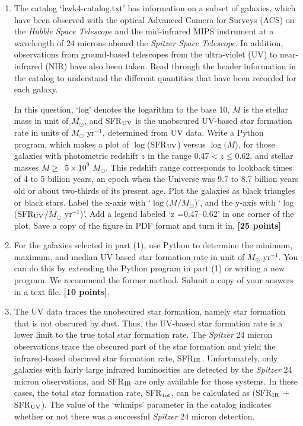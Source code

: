\documentclass[11pt]{article}    %
\begin{document}
\begin{enumerate}

\vspace{1mm}
\item
\noindent
The catalog  `hwk4-catalog.txt' has information on a subset of 
galaxies, which have been observed with the optical 
Advanced Camera for Surveys (ACS) on the {\it Hubble Space Telescope}
and the mid-infrared MIPS  instrument at a wavelength of 24 microns aboard 
the {\it Spitzer Space Telescope}.  In addition, observations from 
ground-based telescopes from the ultra-violet (UV) to near-infrared (NIR) 
have also been taken.  Read through the header information in the catalog
to understand the different quantities that have been recorded for 
each galaxy. 

In this question, `log' denotes
the logarithm to the base 10,  $M$ is the stellar mass in unit of  
$M_{\odot}$, and SFR$_{\rm UV}$ is the unobscured
UV-based star formation rate  in units of $M_{\odot}$  yr$^{-1}$,
determined from UV data.
Write a Python program, 
which makes a plot of $\log$(SFR$_{\rm UV}$) versus $\log(M$), for 
those galaxies with photometric redshift $z$ in the range 
$0.47 < z \le 0.62$, and  stellar masses 
$M \ge$~$5 \times  10^{9}$ $M_{\odot}$. 
This redshift range corresponds to lookback times of 
4 to 5 billion years, an epoch when the Universe was 9.7 to 8.7 
billion years old or about two-thirds of its present age. 
Plot the galaxies as black triangles or black stars.
Label the x-axis with  `$\log(M/M_{\odot}$)', and the y-axis with
`$\log$(SFR$_{\rm UV}$/$M_{\odot}$  yr$^{-1}$)'.
Add a legend labeled `z =0.47--0.62' in one corner of the plot.
Save a copy of the figure in PDF format and turn it in.
 {\bf [25 points]}

\vspace{1mm}
\item
\noindent
For the galaxies selected in part (1), use Python to determine the
minimum, maximum, and median UV-based star formation rate in unit of 
$M_{\odot}$ yr$^{-1}$. You can do this by extending the Python program
in part (1) or writing a new program. We recommend the former method.
Submit a copy of your answers in a text file. 
 {\bf [10 points]}.
 

\vspace{1mm}
\item
\noindent 
The UV data  traces the unobscured star formation, namely star
formation that is not obscured by dust. Thus, the UV-based 
star formation rate
is a lower limit to the true total star formation rate. 
The  {\it Spitzer} 24 micron
observations trace the obscured part of the star formation and yield
the infrared-based obscured star formation rate, SFR$_{\rm IR}$. 
Unfortunately, only galaxies with fairly large infrared luminosities
are detected by the   {\it Spitzer} 24 micron observations, and 
SFR$_{\rm IR}$ are only available for those systems. In these cases, 
the total star formation rate, SFR$_{\rm tot}$, can  be calculated 
as (SFR$_{\rm IR}$ +  SFR$_{\rm UV}$). The value of the  `whmips'
parameter in  the catalog indicates whether or not there was a successful 
{\it Spitzer} 24 micron detection.



\end{enumerate}
\end{document}
